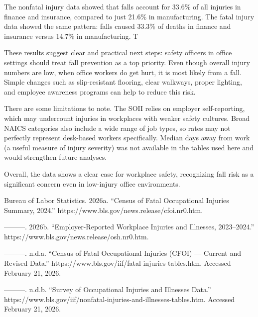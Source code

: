 \documentclass[
  letterpaper,
  DIV=11,
  numbers=noendperiod]{scrreprt}
\newlength{\cslhangindent}
\newenvironment{CSLReferences}[2] %
 {\begin{list}{}{%
  \setlength{\itemindent}{0pt}
  \setlength{\leftmargin}{0pt}
  \setlength{\parsep}{0pt}
  \ifodd #1
   \setlength{\leftmargin}{\cslhangindent}
   \setlength{\itemindent}{-1\cslhangindent}
  \fi
  \setlength{\itemsep}{#2\baselineskip}}}
 {\end{list}}
\begin{document}
The nonfatal injury data showed that falls account for 33.6\% of all
injuries in finance and insurance, compared to just 21.6\% in
manufacturing. The fatal injury data showed the same pattern: falls
caused 33.3\% of deaths in finance and insurance versus 14.7\% in
manufacturing. T

These results suggest clear and practical next steps: safety officers in
office settings should treat fall prevention as a top priority. Even
though overall injury numbers are low, when office workers do get hurt,
it is most likely from a fall. Simple changes such as slip-resistant
flooring, clear walkways, proper lighting, and employee awareness
programs can help to reduce this risk.

There are some limitations to note. The SOII relies on employer
self-reporting, which may undercount injuries in workplaces with weaker
safety cultures. Broad NAICS categories also include a wide range of job
types, so rates may not perfectly represent desk-based workers
specifically. Median days away from work (a useful measure of injury
severity) was not available in the tables used here and would strengthen
future analyses.

Overall, the data shows a clear case for workplace safety, recognizing
fall risk as a significant concern even in low-injury office
environments.

\label{refs}
\begin{CSLReferences}{1}{0}
Bureau of Labor Statistics. 2026a. {``Census of Fatal Occupational
Injuries Summary, 2024.''}
https://www.bls.gov/news.release/cfoi.nr0.htm.

---------. 2026b. {``Employer-Reported Workplace Injuries and Illnesses,
2023--2024.''} https://www.bls.gov/news.release/osh.nr0.htm.

---------. n.d.a. {``Census of Fatal Occupational Injuries ({CFOI}) ---
Current and Revised Data.''}
https://www.bls.gov/iif/fatal-injuries-tables.htm. Accessed February 21,
2026.

---------. n.d.b. {``Survey of Occupational Injuries and Illnesses
Data.''}
https://www.bls.gov/iif/nonfatal-injuries-and-illnesses-tables.htm.
Accessed February 21, 2026.

\end{CSLReferences}
\end{document}
